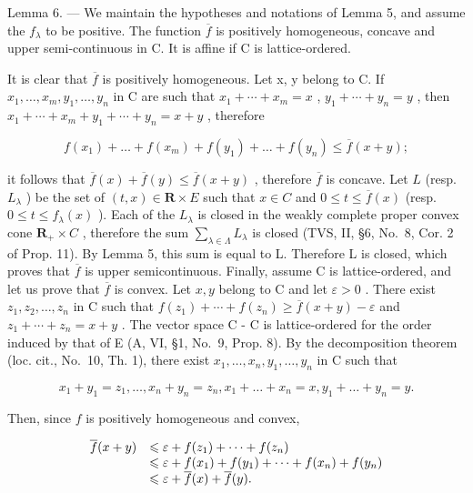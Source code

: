 Lemma 6. --- We maintain the hypotheses and notations of Lemma 5, and assume the \(f_{\lambda}\) to be positive. The function \(\overline{f}\) is positively homogeneous, concave and upper semi-continuous in C. It is affine if C is lattice-ordered.

It is clear that \(\overline{f}\) is positively homogeneous. Let x, y belong to C. If \(x_{1}, \ldots, x_{m}, y_{1}, \ldots, y_{n}\) in C are such that \(x_{1} + \cdots + x_{m} = x\) , \(y_{1} + \cdots + y_{n} = y\) , then \(x_{1} + \cdots + x_{m} + y_{1} + \cdots + y_{n} = x + y\) , therefore

\[
f (x _ {1}) + \dots + f (x _ {m}) + f (y _ {1}) + \dots + f (y _ {n}) \leqslant \overline {{f}} (x + y);
\]

it follows that \(\overline{f}(x) + \overline{f}(y) \leqslant \overline{f}(x + y)\) , therefore \(\overline{f}\) is concave. Let \(L\) (resp. \(L_{\lambda}\) ) be the set of \((t, x) \in \mathbf{R} \times E\) such that \(x \in C\) and \(0 \leqslant t \leqslant \overline{f}(x)\) (resp. \(0 \leqslant t \leqslant f_{\lambda}(x)\) ). Each of the \(L_{\lambda}\) is closed in the weakly complete proper convex cone \(\mathbf{R}_{+} \times C\) , therefore the sum \(\sum_{\lambda \in \Lambda} L_{\lambda}\) is closed (TVS, II, §6, No.~8, Cor. 2 of Prop. 11). By Lemma 5, this sum is equal to L. Therefore L is closed, which proves that \(\overline{f}\) is upper semicontinuous. Finally, assume C is lattice-ordered, and let us prove that \(\overline{f}\) is convex. Let \(x, y\) belong to C and let \(\varepsilon > 0\) . There exist \(z_1, z_2, \ldots, z_n\) in C such that \(f(z_1) + \cdots + f(z_n) \geqslant \overline{f}(x + y) - \varepsilon\) and \(z_1 + \cdots + z_n = x + y\) . The vector space C - C is lattice-ordered for the order induced by that of E (A, VI, §1, No.~9, Prop. 8). By the decomposition theorem (loc. cit., No.~10, Th. 1), there exist \(x_1, \ldots, x_n, y_1, \ldots, y_n\) in C such that

\[
x _ {1} + y _ {1} = z _ {1}, \dots , x _ {n} + y _ {n} = z _ {n}, x _ {1} + \dots + x _ {n} = x, y _ {1} + \dots + y _ {n} = y.
\]

Then, since \(f\) is positively homogeneous and convex,

\[
\begin{array}{r l} \overline {{f}} (x + y) & \leqslant \varepsilon + f (z _ {1}) + \dots + f (z _ {n}) \\ & \leqslant \varepsilon + f (x _ {1}) + f (y _ {1}) + \dots + f (x _ {n}) + f (y _ {n}) \\ & \leqslant \varepsilon + \overline {{f}} (x) + \overline {{f}} (y). \end{array}
\]

